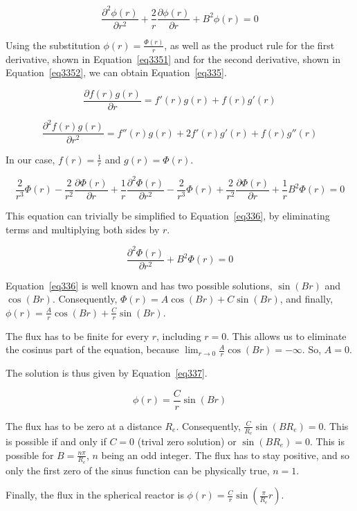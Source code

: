 \begin{equation}\label{eq334}
\frac{\partial^2 \phi(r)}{\partial r^2} + \frac{2}{r}\frac{\partial \phi(r)}{\partial r} + B^2\phi(r) = 0
\end{equation}

Using the substitution $\phi(r) = \frac{\Phi(r)}{r}$, as well as the product rule for the first derivative, shown in Equation~\ref{eq3351} and for the second derivative, shown in Equation~\ref{eq3352}, we can obtain Equation~\ref{eq335}.


\begin{equation}\label{eq3351}
\frac{\partial f(r)g(r)}{\partial r} = f'(r)g(r) + f(r)g'(r)
\end{equation}

\begin{equation}\label{eq3352}
\frac{\partial^2 f(r)g(r)}{\partial r^2} = f''(r)g(r) + 2f'(r)g'(r) + f(r)g''(r)
\end{equation}

In our case, $f(r) = \frac{1}{r}$ and $g(r) = \Phi(r)$.

\begin{equation}\label{eq335}
\frac{2}{r^3}\Phi(r) - \frac{2}{r^2}\frac{\partial \Phi(r)}{\partial r} + \frac{1}{r}\frac{\partial^2 \Phi(r)}{\partial r^2} - \frac{2}{r^3}\Phi(r) + \frac{2}{r^2}\frac{\partial \Phi(r)}{\partial r} + \frac{1}{r}B^2\Phi(r) = 0
\end{equation}

This equation can trivially be simplified to Equation~\ref{eq336}, by eliminating terms and multiplying both sides by $r$.

\begin{equation}\label{eq336}
\frac{\partial^2 \Phi(r)}{\partial r^2} + B^2\Phi(r) = 0
\end{equation}

Equation~\ref{eq336} is well known and has two possible solutions, $\sin(Br)$ and $\cos(Br)$. Consequently, $\Phi(r) = A\cos(Br) + C\sin(Br)$, and finally, $\phi(r) = \frac{A}{r}\cos(Br) + \frac{C}{r}\sin(Br)$.

The flux has to be finite for every $r$, including $r=0$. This allows us to eliminate the cosinus part of the equation, because $\lim_{r\to 0} \frac{A}{r}\cos(Br) = - \infty$. So, $A = 0$.

The solution is thus given by Equation~\ref{eq337}.

\begin{equation}\label{eq337}
\phi(r) = \frac{C}{r}\sin(Br)
\end{equation}

The flux has to be zero at a distance $R_e$. Consequently, $\frac{C}{R_e}\sin(BR_e) = 0$. This is possible if and only if $C = 0$ (trival zero solution) or $\sin(BR_e) = 0$. This is possible for $B = \frac{n\pi}{R_e}$, $n$ being an odd integer. The flux has to stay positive, and so only the first zero of the sinus function can be physically true, $n = 1$.

Finally, the flux in the spherical reactor is $\phi(r) = \frac{C}{r}\sin(\frac{\pi}{R_e}r)$.
